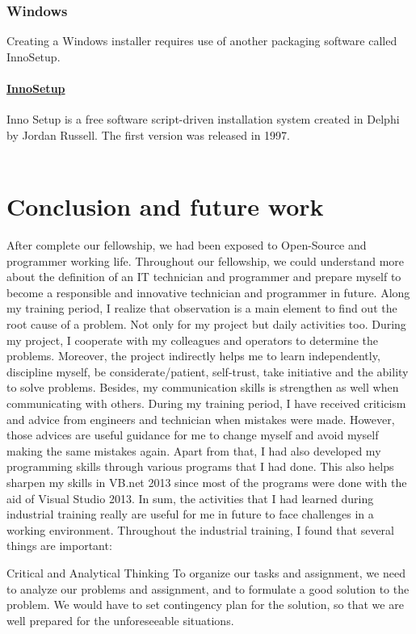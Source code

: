 \documentclass[12pt,a4paper]{report}
\begin{document}
\subsection{Windows}
Creating a Windows installer requires use of another packaging software called InnoSetup.
\subsubsection{\href{http://jrsoftware.org/isinfo.php}{InnoSetup}}
Inno Setup is a free software script-driven installation system created in Delphi by Jordan Russell. The first version was released in 1997.\\
\\

\chapter{\textbf{Conclusion and future work}}
After complete our fellowship, we had been exposed to Open-Source and programmer working life. Throughout our fellowship, we could understand more about the definition of an IT technician and programmer and prepare myself to become a responsible and innovative technician and programmer in future. Along my training period, I realize that observation is a main element to find out the root cause of a problem. Not only for my project but daily activities too. During my project, I cooperate with my colleagues and operators to determine the problems. Moreover, the project indirectly helps me to learn independently, discipline myself, be considerate/patient, self-trust, take initiative and the ability to solve problems. Besides, my communication skills is strengthen as well when communicating with others. During my training period, I have received criticism and advice from engineers and technician when mistakes were made. However, those advices are useful guidance for me to change myself and avoid myself making the same mistakes again. Apart from that, I had also developed my programming skills through various programs that I had done. This also helps sharpen my skills in VB.net 2013 since most of the programs were done with the aid of Visual Studio 2013. In sum, the activities that I had learned during industrial training really are useful for me in future to face challenges in a working environment. Throughout the industrial training, I found that several things are important: 

Critical and Analytical Thinking
To organize our tasks and assignment, we need to analyze our problems and assignment, and to formulate a good solution to the problem. We would have to set contingency plan for the solution, so that we are well prepared for the unforeseeable situations. 
\end{document}
